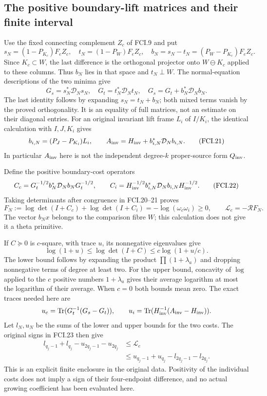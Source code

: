 \subsection{The positive boundary-lift matrices and their finite interval}

Use the fixed connecting complement $Z_c$ of FCI.9 and put
\[
 s_N=(1-P_{K_c})F_eZ_c,\quad t_N=(1-P_W)F_eZ_c,\quad
 b_N=s_N-t_N=(P_W-P_{K_c})F_eZ_c.
 \tag{FCI.19}
\]
Since $K_c\subset W$, the last difference is the orthogonal projector
onto $W\ominus K_c$ applied to these columns.  Thus $b_N$ lies in
that space and $t_N\perp W$.  The normal-equation descriptions
of the two minima give
\[
 G_s=s_N^*\mathcal D_Ns_N,\quad G_t=t_N^*\mathcal D_Nt_N,\quad
 G_s=G_t+b_N^*\mathcal D_Nb_N.
 \tag{FCI.20}
\]
The last identity follows by expanding $s_N=t_N+b_N$; both mixed
terms vanish by the proved orthogonality.  It is an equality of full
matrices, not an estimate on their diagonal entries.
For an original invariant lift frame $L_i$ of $I/K_i$, the identical
calculation with $I,J,K_i$ gives
\[
 b_{i,N}=(P_J-P_{K_i})L_i,\qquad
 A_{\rm inv}=H_{\rm inv}+b_{i,N}^*\mathcal D_Nb_{i,N}.
 \tag{FCI.21}
\]
In particular $A_{\rm inv}$ here is not the independent degree-$k$
proper-source form $Q_{\rm inv}$.

Define the positive boundary-cost operators
\[
 C_c=G_t^{-1/2}b_N^*\mathcal D_Nb_NG_t^{-1/2},\qquad
 C_i=H_{\rm inv}^{-1/2}b_{i,N}^*\mathcal D_Nb_{i,N}H_{\rm inv}^{-1/2}.
 \tag{FCI.22}
\]
Taking determinants after congruence in FCI.20--21 proves
\[
 F_N:=\log\det(I+C_c)+\log\det(I+C_i)
       =-\log(\omega_c\omega_i)\geq0,\qquad
 \mathcal L_e=-\mathcal RF_N.
 \tag{FCI.23}
\]
The vector $b_Nx$ belongs to the comparison fibre $W$; this calculation
does not give it a theta primitive.

If $C\succeq0$ is $c$-square, with trace $u$, its nonnegative
eigenvalues give
\[
 \log(1+u)\leq\log\det(I+C)\leq c\log(1+u/c).
 \tag{FCI.24}
\]
The lower bound follows by expanding the product $\prod(1+\lambda_a)$
and dropping nonnegative terms of degree at least two.  For the upper
bound, concavity of $\log$ applied to the $c$ positive numbers
$1+\lambda_a$ gives their average logarithm at most the logarithm
of their average.  When $c=0$ both bounds mean zero.
The exact traces needed here are
\[
 u_c=\operatorname{Tr}(G_t^{-1}(G_s-G_t)),\qquad
 u_i=\operatorname{Tr}(H_{\rm inv}^{-1}(A_{\rm inv}-H_{\rm inv})).
\]
Let $l_N,u_N$ be the sums of the lower and upper bounds for the
two costs.  The original signs in FCI.23 then give
\[
 \begin{split}
 l_{q_j-1}+l_{q_j}-u_{2q_j-1}-u_{2q_j}
 &\leq\mathcal L_e\\
 &\leq u_{q_j-1}+u_{q_j}-l_{2q_j-1}-l_{2q_j}.
 \end{split}\tag{FCI.25}
\]
This is an explicit finite enclosure in the original data.  Positivity
of the individual costs does not imply a sign of their four-endpoint
difference, and no actual growing coefficient has been evaluated here.

